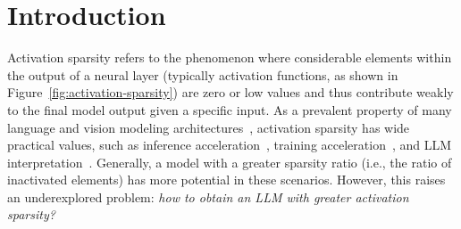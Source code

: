 \documentclass{article} %
\begin{document}
\section{Introduction} \label{sec:introduction}

Activation sparsity refers to the phenomenon where considerable elements within the output of a neural layer (typically activation functions, as shown in Figure~\ref{fig:activation-sparsity}) are zero or low values and thus contribute weakly to the final model output given a specific input.
As a prevalent property of many language and vision modeling architectures~\citep{li2022lazy}, activation sparsity has wide practical values, such as inference acceleration~\citep{liu2023deja,song2023powerinfer,xue2024powerinfer,song2024prosparse}, training acceleration~\citep{zhang2024exploring}, and LLM interpretation~\citep{sajjad2022neuron,zhang2023emergent}. Generally, a model with a greater sparsity ratio (i.e., the ratio of inactivated elements) has more potential in these scenarios. However, this raises an underexplored problem: \textit{how to obtain an LLM with greater activation sparsity?}

\end{document}
